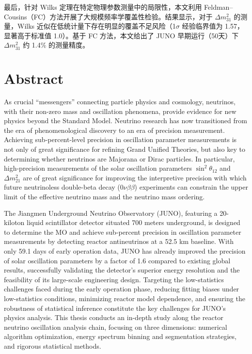 最后，针对 Wilks 定理在特定物理参数测量中的局限性，本文利用 Feldman–Cousins（FC）方法开展了大规模频率学覆盖性检验。结果显示，对于 $\Delta m^2_{31}$ 的测量，Wilks 近似在低统计量下存在明显的覆盖不足风险（1$\sigma$ 经验临界值为 1.57，显著高于标准值 1.0）。基于 FC 方法，本文给出了 JUNO 早期运行（50天）下 $\Delta m^2_{31}$ 约 1.4\% 的测量精度。



\intobmk\chapter*{Abstract}%

As crucial ``messengers'' connecting particle physics and cosmology, neutrinos, with their non-zero mass and oscillation phenomena, provide evidence for new physics beyond the Standard Model. Neutrino research has now transitioned from the era of phenomenological discovery to an era of precision measurement. Achieving sub-percent-level precision in oscillation parameter measurements is not only of great significance for refining Grand Unified Theories, but also key to determining whether neutrinos are Majorana or Dirac particles. In particular, high-precision measurements of the solar oscillation parameters $\sin^2\theta_{12}$ and $\Delta m^2_{21}$ are of great significance for improving the interpretive precision with which future neutrinoless double-beta decay ($0\nu\beta\beta$) experiments can constrain the upper limit of the effective neutrino mass and the neutrino mass ordering.

The Jiangmen Underground Neutrino Observatory (JUNO), featuring a 20-kiloton liquid scintillator detector situated 700 meters underground, is designed to determine the MO and achieve sub-percent precision in oscillation parameter measurements by detecting reactor antineutrinos at a 52.5 km baseline. With only 59.1 days of early operation data, JUNO has already improved the precision of solar oscillation parameters by a factor of 1.6 compared to existing global results, successfully validating the detector’s superior energy resolution and the feasibility of its large-scale engineering design. Targeting the low-statistics challenges faced during the early operation phase, reducing fitting biases under low-statistics conditions, minimizing reactor model dependence, and ensuring the robustness of statistical inference constitute the key challenges for JUNO’s physics analysis. This thesis conducts an in-depth study along the reactor neutrino oscillation analysis chain, focusing on three dimensions: numerical algorithm optimization, energy spectrum binning and segmentation strategies, and rigorous statistical methods.

